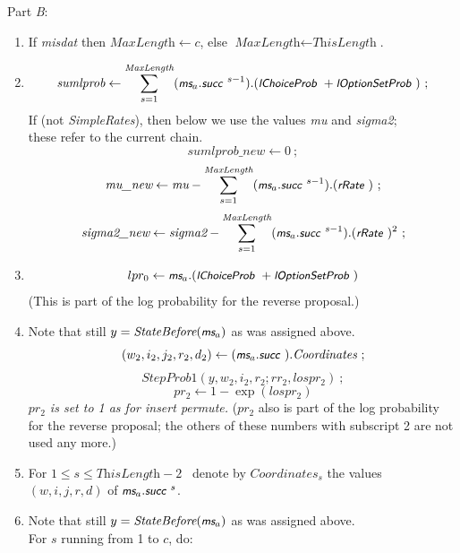 \documentclass[a4paper,12pt,fleqn]{article}
\newcommand{\nnm}[1]{\textsf{\small\textit{#1}\ }}
\newcommand{\ms}{\textsl{\textsf{\small ms}}} %
\newcommand{\remark}[1]{{\textcolor[named]{Red}{#1}}}
\begin{document}
Part \emph{B}:
\begin{enumerate}[resume]
\item If \textit{misdat} then $ \textit{MaxLength} \leftarrow c$, else
      $ \textit{MaxLength} \leftarrow \textit{ThisLength}$.\\
\item \[ \textit{sumlprob} \leftarrow \sum_{s=1}^{\textit{MaxLength}}
             (\ms_a.\nnm{succ}^{s-1}).(\nnm{lChoiceProb} + \nnm{lOptionSetProb}) \ ;
      \]
      If (not \textit{SimpleRates}), then below we use
      the values \textit{mu} and \textit{sigma2}; \\
      these refer to the current chain.
      \[
      \textit{sumlprob\_new}  \leftarrow 0 \ ;
      \]
      \[
      \textit{mu\_new}  \leftarrow \textit{mu} -  \sum_{s=1}^{\textit{MaxLength}}
             (\ms_a.\nnm{succ}^{s-1}).(\nnm{rRate}) \ ;
      \]
      \[
      \textit{sigma2\_new}  \leftarrow \textit{sigma2} -  \sum_{s=1}^{\textit{MaxLength}}
             (\ms_a.\nnm{succ}^{s-1}).(\nnm{rRate})^2 \ ;
      \]
\item \[
      lpr_0 \leftarrow \ms_a.(\nnm{lChoiceProb} + \nnm{lOptionSetProb})
      \]
      (This is part of the log probability for the reverse proposal.)
\item Note that still $y =  \textit{StateBefore}(\ms_a)$ as was assigned above.
      \[
      (w_2, i_2, j_2, r_2, d_2) \leftarrow (\ms_a.\nnm{succ}).\textit{Coordinates} \ ;
      \]
      \[
      \textit{StepProb1}(y,w_2,i_2,r_2;rr_2,lospr_2)\ ;
      \]
      \[
      pr_2 \leftarrow 1 - \exp(lospr_2)
      \]
\emph{$pr_2$ is set to 1 as for insert permute.}
      ($pr_2$ also is part of the log probability for the reverse proposal;
      the others of these numbers with subscript 2 are not used any more.)
\item For $1 \leq s \leq \textit{ThisLength}-2$ \
      denote by $\textit{Coordinates}_s$ the values
      $(w,i,j,r,d)$ of $\ms_a.\nnm{succ}^{s}$.\\
\item Note that still $y =  \textit{StateBefore}(\ms_a)$ as was assigned above.\\
      For $s$ running from 1 to $c$, do:
      \begin{enumerate}

\end{enumerate}
\end{enumerate}
\end{document}
